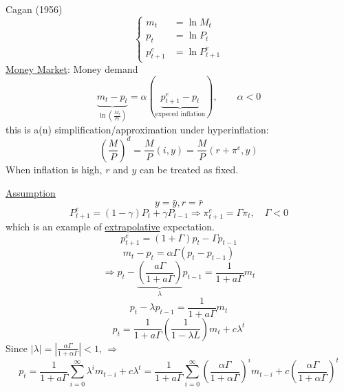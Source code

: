 \documentclass[twoside]{article}
\newcommand\imp{$\Longrightarrow$}
\begin{document}
\begin{example} Cagan (1956)
\begin{equation}
    \begin{cases}
        m_t &= \ln M_{t}\\
        p_{t} &= \ln P_{t}\\
        p^e_{t+1} &= \ln P^{e}_{t+1}  
    \end{cases}
\end{equation}
\underline{Money Market}: Money demand
\begin{equation}
    \underbrace{m_t - p_t}_{\ln (\frac{M_t}{P_t})} = \alpha (\underbrace{p^e_{t+1} - p_{t}}_{\text{expeced inflation}}), \qquad \alpha <0
\end{equation}
this is a(n) simplification/approximation under hyperinflation:
\begin{equation}
    (\frac{M}{P})^{d} = \frac{M}{P}(i, y) = \frac{M}{P}(r + {\pi^{e}}, y) 
\end{equation}
When inflation is high, $r$ and $y$ can be treated as fixed.

\underline{Assumption}
$$y = \bar{y}, r = \bar{r}$$
\begin{equation}
    P^{e}_{t+1} = (1-\gamma) P_{t} + \gamma P_{t-1} \Longrightarrow \pi_{t+1}^{e} = \Gamma \pi_{t}, \quad \Gamma < 0
\end{equation}
which is an example of \underline{extrapolative} expectation.
\begin{equation}
    p_{t+1}^{e} = (1+ \Gamma)p_{t} - \Gamma p_{t-1}
\end{equation}
\begin{equation}
    m_{t} - p_{t} = \alpha \Gamma (p_{t}-p_{t-1})
\end{equation}
\begin{equation}
    \Longrightarrow p_{t} - \underbrace{(\frac{a \Gamma}{1 + a \Gamma})}_{\lambda} p_{t-1} = \frac{1}{1 + a \Gamma} m_{t}
\end{equation}
\begin{equation}
    p_{t} - \lambda p_{t-1} = \frac{1}{1 + a \Gamma} m_{t}
\end{equation}
\begin{equation}
    p_{t} = \frac{1}{1 + a \Gamma} (\frac{1}{1 - \lambda L})m_{t} + c \lambda^{t}
\end{equation}
Since $|\lambda| = |\frac{\alpha \Gamma}{1+ \alpha \Gamma} | < 1$, \imp
\begin{equation}
    p_{t} = \frac{1}{1 + a \Gamma} \sum_{i=0}^{\infty} \lambda^{i} m_{t-i} + c \lambda^{t} = \frac{1}{1 + a \Gamma} \sum_{i=0}^{\infty} (\frac{\alpha \Gamma}{1+ \alpha \Gamma})^{i} m_{t-i} + c (\frac{\alpha \Gamma}{1+ \alpha \Gamma})^{t}
\end{equation}
\end{example}
\end{document}
